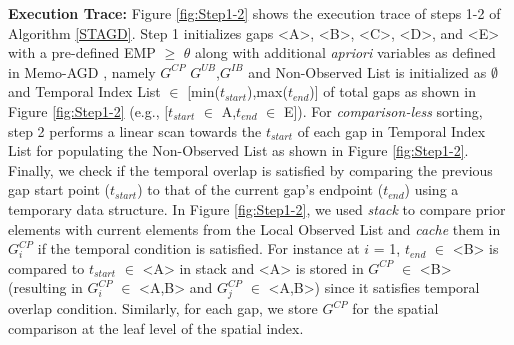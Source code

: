 \documentclass[acmsmall]{acmart}
\begin{document}
\textbf{Execution Trace:} Figure \ref{fig:Step1-2} shows the execution trace of steps 1-2 of Algorithm \ref{STAGD}. Step 1 initializes gaps <A>, <B>, <C>, <D>, and <E> with a pre-defined EMP $\geq$ $\theta$ along with additional \textit{apriori} variables as defined in Memo-AGD \cite{sharma2022abnormal}, namely $G^{CP}$ $G^{UB}$,$G^{IB}$ and  Non-Observed List is initialized as $\emptyset$ and Temporal Index List $\in$ [min($t_{start}$),max($t_{end}$)] of total gaps as shown in Figure \ref{fig:Step1-2} (e.g., [$t_{start}$ $\in$ A,$t_{end}$ $\in$ E]). For \textit{comparison-less} sorting, step 2 performs a linear scan towards the $t_{start}$ of each gap in Temporal Index List for populating the Non-Observed List as shown in Figure \ref{fig:Step1-2}. Finally, we check if the temporal overlap is satisfied by comparing the previous gap start point ($t_{start}$) to that of the current gap's endpoint ($t_{end}$) using a temporary data structure. In Figure \ref{fig:Step1-2}, we used \textit{stack} to compare prior elements with current elements from the Local Observed List and \textit{cache} them in $G^{CP}_{i}$ if the temporal condition is satisfied. For instance at $i$ = 1, $t_{end}$ $\in$ <B> is compared to $t_{start}$ $\in$ <A> in stack and <A> is stored in $G^{CP}$ $\in$ <B> (resulting in $G_{i}^{CP}$ $\in$ <A,B> and $G_{j}^{CP}$ $\in$ <A,B>) since it satisfies temporal overlap condition. Similarly, for each gap, we store $G^{CP}$ for the spatial comparison at the leaf level of the spatial index.


\end{document}
